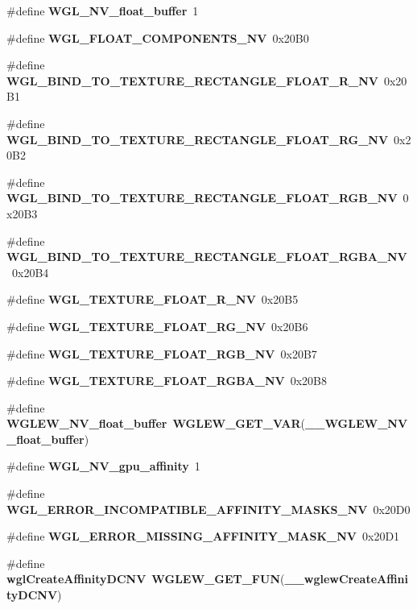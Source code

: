 \begin{DoxyCompactItemize}
\item 
\#define {\bf W\+G\+L\+\_\+\+N\+V\+\_\+float\+\_\+buffer}~1
\item 
\#define {\bf W\+G\+L\+\_\+\+F\+L\+O\+A\+T\+\_\+\+C\+O\+M\+P\+O\+N\+E\+N\+T\+S\+\_\+\+NV}~0x20\+B0
\item 
\#define {\bf W\+G\+L\+\_\+\+B\+I\+N\+D\+\_\+\+T\+O\+\_\+\+T\+E\+X\+T\+U\+R\+E\+\_\+\+R\+E\+C\+T\+A\+N\+G\+L\+E\+\_\+\+F\+L\+O\+A\+T\+\_\+\+R\+\_\+\+NV}~0x20\+B1
\item 
\#define {\bf W\+G\+L\+\_\+\+B\+I\+N\+D\+\_\+\+T\+O\+\_\+\+T\+E\+X\+T\+U\+R\+E\+\_\+\+R\+E\+C\+T\+A\+N\+G\+L\+E\+\_\+\+F\+L\+O\+A\+T\+\_\+\+R\+G\+\_\+\+NV}~0x20\+B2
\item 
\#define {\bf W\+G\+L\+\_\+\+B\+I\+N\+D\+\_\+\+T\+O\+\_\+\+T\+E\+X\+T\+U\+R\+E\+\_\+\+R\+E\+C\+T\+A\+N\+G\+L\+E\+\_\+\+F\+L\+O\+A\+T\+\_\+\+R\+G\+B\+\_\+\+NV}~0x20\+B3
\item 
\#define {\bf W\+G\+L\+\_\+\+B\+I\+N\+D\+\_\+\+T\+O\+\_\+\+T\+E\+X\+T\+U\+R\+E\+\_\+\+R\+E\+C\+T\+A\+N\+G\+L\+E\+\_\+\+F\+L\+O\+A\+T\+\_\+\+R\+G\+B\+A\+\_\+\+NV}~0x20\+B4
\item 
\#define {\bf W\+G\+L\+\_\+\+T\+E\+X\+T\+U\+R\+E\+\_\+\+F\+L\+O\+A\+T\+\_\+\+R\+\_\+\+NV}~0x20\+B5
\item 
\#define {\bf W\+G\+L\+\_\+\+T\+E\+X\+T\+U\+R\+E\+\_\+\+F\+L\+O\+A\+T\+\_\+\+R\+G\+\_\+\+NV}~0x20\+B6
\item 
\#define {\bf W\+G\+L\+\_\+\+T\+E\+X\+T\+U\+R\+E\+\_\+\+F\+L\+O\+A\+T\+\_\+\+R\+G\+B\+\_\+\+NV}~0x20\+B7
\item 
\#define {\bf W\+G\+L\+\_\+\+T\+E\+X\+T\+U\+R\+E\+\_\+\+F\+L\+O\+A\+T\+\_\+\+R\+G\+B\+A\+\_\+\+NV}~0x20\+B8
\item 
\#define {\bf W\+G\+L\+E\+W\+\_\+\+N\+V\+\_\+float\+\_\+buffer}~{\bf W\+G\+L\+E\+W\+\_\+\+G\+E\+T\+\_\+\+V\+AR}({\bf \+\_\+\+\_\+\+W\+G\+L\+E\+W\+\_\+\+N\+V\+\_\+float\+\_\+buffer})
\item 
\#define {\bf W\+G\+L\+\_\+\+N\+V\+\_\+gpu\+\_\+affinity}~1
\item 
\#define {\bf W\+G\+L\+\_\+\+E\+R\+R\+O\+R\+\_\+\+I\+N\+C\+O\+M\+P\+A\+T\+I\+B\+L\+E\+\_\+\+A\+F\+F\+I\+N\+I\+T\+Y\+\_\+\+M\+A\+S\+K\+S\+\_\+\+NV}~0x20\+D0
\item 
\#define {\bf W\+G\+L\+\_\+\+E\+R\+R\+O\+R\+\_\+\+M\+I\+S\+S\+I\+N\+G\+\_\+\+A\+F\+F\+I\+N\+I\+T\+Y\+\_\+\+M\+A\+S\+K\+\_\+\+NV}~0x20\+D1
\item 
\#define {\bf wgl\+Create\+Affinity\+D\+C\+NV}~{\bf W\+G\+L\+E\+W\+\_\+\+G\+E\+T\+\_\+\+F\+UN}({\bf \+\_\+\+\_\+wglew\+Create\+Affinity\+D\+C\+NV})

\end{DoxyCompactItemize}

